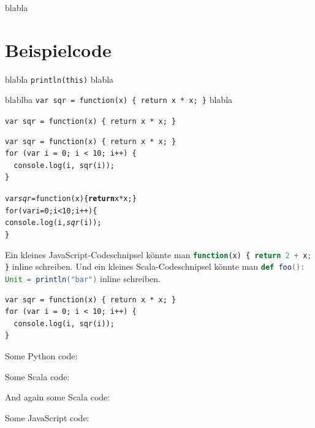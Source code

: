 \documentclass[a4paper, 12pt, listof=totoc, bibliography=totoc]{scrreprt}
\begin{document}
blabla


\section{Beispielcode}

blabla \verb|println(this)| blabla

blablba \verb|var sqr = function(x) { return x * x; }| blabla

\verb|var sqr = function(x) { return x * x; }|

\begin{verbatim}
var sqr = function(x) { return x * x; }
for (var i = 0; i < 10; i++) {
  console.log(i, sqr(i));
}
\end{verbatim}

\begin{alltt}
var \emph{sqr} = function(x) \{ \textbf{return} x * x; \}
for (var i = 0; i < 10; i++) \{
  console.log(i, \emph{sqr}(i));
\}
\end{alltt}


Ein kleines JavaScript-Codeschnipsel könnte man \lstinline[language=JavaScript, style=inline]!function(x) { return 2 + x; }! inline schreiben. Und ein kleines Scala-Codeschnipsel könnte man \lstinline[language=Scala, style=inline]|def foo(): Unit = println("bar")| inline schreiben.


\begin{lstlisting}
var sqr = function(x) { return x * x; }
for (var i = 0; i < 10; i++) {
  console.log(i, sqr(i));
}
\end{lstlisting}

Some Python code:





Some Scala code:


And again some Scala code:





Some JavaScript code:

\end{document}
